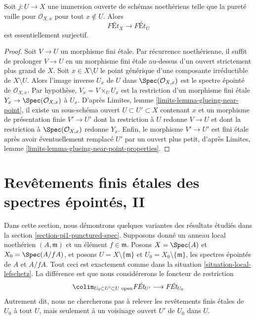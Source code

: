 \begin{lemma}
\label{lemma-extend-pure}
Soit $j : U \to X$ une immersion ouverte de schémas noethériens
telle que la pureté vaille pour $\mathcal{O}_{X, x}$ pour tout $x \not \in U$.
Alors
$$
\textit{F\'Et}_X \longrightarrow \textit{F\'Et}_U
$$
est essentiellement surjectif.
\end{lemma}

\begin{proof}
Soit $V \to U$ un morphisme fini étale. Par récurrence noethérienne,
il suffit de prolonger $V \to U$ en un morphisme fini étale
au-dessus d'un ouvert strictement plus grand de $X$.
Soit $x \in X \setminus U$ le point générique d'une
composante irréductible de $X \setminus U$.
Alors l'image inverse $U_x$ de $U$ dans $\Spec(\mathcal{O}_{X, x})$
est le spectre épointé de $\mathcal{O}_{X, x}$.
Par hypothèse, $V_x = V \times_U U_x$ est la restriction
d'un morphisme fini étale $Y_x \to \Spec(\mathcal{O}_{X, x})$
à $U_x$.
D'après Limites, lemme \ref{limits-lemma-glueing-near-point},
il existe un sous-schéma ouvert $U \subset U' \subset X$
contenant $x$ et un morphisme de présentation finie $V' \to U'$
dont la restriction à $U$ redonne $V \to U$ et
dont la restriction à $\Spec(\mathcal{O}_{X, x})$ redonne $Y_x$.
Enfin, le morphisme $V' \to U'$ est fini étale
après avoir éventuellement remplacé $U'$ par un ouvert plus petit, d'après
Limites, lemme \ref{limits-lemma-glueing-near-point-properties}.
\end{proof}
















\section{Revêtements finis étales des spectres épointés, II}
\label{section-pi1-punctured-spec-II}

\noindent
Dans cette section, nous démontrons quelques variantes des résultats étudiés
dans la section \ref{section-pi1-punctured-spec}. Supposons
donné un anneau local noethérien $(A, \mathfrak m)$ et un élément $f \in \mathfrak m$.
Posons $X = \Spec(A)$ et $X_0 = \Spec(A/fA)$, et
posons $U = X \setminus \{\mathfrak m\}$ et
$U_0 = X_0 \setminus \{\mathfrak m\}$, les spectres épointés de
$A$ et $A/fA$. Tout ceci est exactement comme dans la
situation \ref{situation-local-lefschetz}.
La différence est que nous considérerons le foncteur de restriction
$$
\colim_{U_0 \subset U' \subset U\text{ open}} \textit{F\'Et}_{U'}
\longrightarrow
\textit{F\'Et}_{U_0}
$$
Autrement dit, nous ne chercherons pas à relever les revêtements finis étales
de $U_0$ à tout $U$, mais seulement à un voisinage ouvert
$U'$ de $U_0$ dans $U$.

